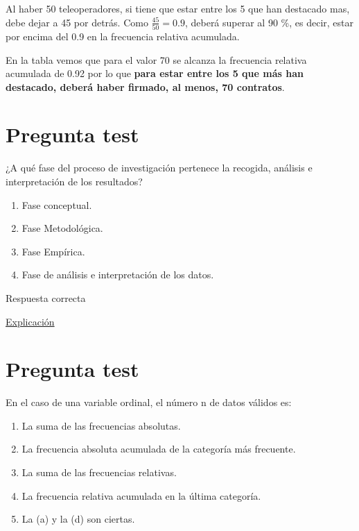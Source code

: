 \documentclass[
]{book}
\providecommand{\tightlist}{%
  \setlength{\itemsep}{0pt}\setlength{\parskip}{0pt}}
\begin{document}
Al haber 50 teleoperadores, si tiene que estar entre los 5 que han destacado mas, debe dejar a 45 por detrás. Como \(\frac{45}{50}=0.9\), deberá superar al 90 \%, es decir, estar por encima del 0.9 en la frecuencia relativa acumulada.

En la tabla vemos que para el valor 70 se alcanza la frecuencia relativa acumulada de 0.92 por lo que \textbf{para estar entre los 5 que más han destacado, deberá haber firmado, al menos, 70 contratos}.

\hypertarget{pregunta-test-3}{%
\section{Pregunta test}\label{pregunta-test-3}}

¿A qué fase del proceso de investigación pertenece la recogida, análisis e interpretación de los resultados?

\begin{enumerate}
\def\labelenumi{\alph{enumi})}
\tightlist
\item
  Fase conceptual.
\item
  Fase Metodológica.
\item
  Fase Empírica.
\item
  Fase de análisis e interpretación de los datos.
\end{enumerate}

Respuesta correcta

\href{https://www.salusplay.com/apuntes/apuntes-metodologia-de-la-investigacion/tema-4-el-proceso-de-investigacion-fases-de-realizacion-de-una-investigacion-cientifica/2}{Explicación}

\hypertarget{pregunta-test-4}{%
\section{Pregunta test}\label{pregunta-test-4}}

En el caso de una variable ordinal, el número n de datos válidos es:

\begin{enumerate}
\def\labelenumi{\alph{enumi})}
\tightlist
\item
  La suma de las frecuencias absolutas.
\item
  La frecuencia absoluta acumulada de la categoría más frecuente.
\item
  La suma de las frecuencias relativas.
\item
  La frecuencia relativa acumulada en la última categoría.
\item
  La (a) y la (d) son ciertas.
\end{enumerate}
\end{document}
